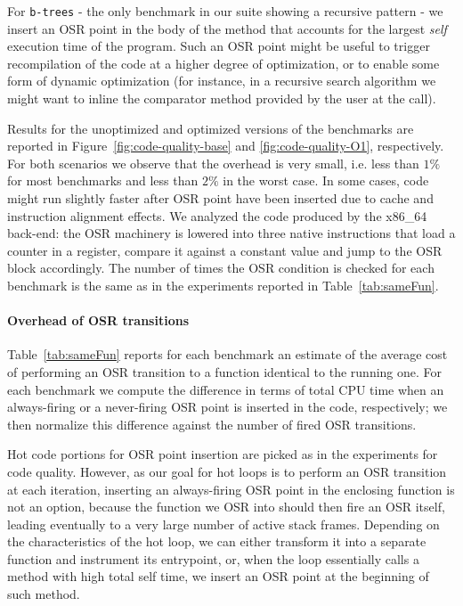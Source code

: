 For {\tt b-trees} - the only benchmark in our suite showing a recursive pattern - we insert an OSR point in the body of the method that accounts for the largest {\em self} execution time of the program. Such an OSR point might be useful to trigger recompilation of the code at a higher degree of optimization, or to enable some form of dynamic optimization (for instance, in a recursive search algorithm we might want to inline the comparator method provided by the user at the call).

Results for the unoptimized and optimized versions of the benchmarks are reported in Figure~\ref{fig:code-quality-base} and \ref{fig:code-quality-O1}, respectively. For both scenarios we observe that the overhead is very small, i.e. less than $1\%$ for most benchmarks and less than $2\%$ in the worst case. In some cases, code might run slightly faster after OSR point have been inserted due to cache and instruction alignment effects. We analyzed the code produced by the x86\_64 back-end: the OSR machinery is lowered into three native instructions that load a counter in a register, compare it against a constant value and jump to the OSR block accordingly. The number of times the OSR condition is checked for each benchmark is the same as in the experiments reported in Table~\ref{tab:sameFun}.
  
\paragraph{Overhead of OSR transitions}

Table~\ref{tab:sameFun} reports for each benchmark an estimate of the average cost of performing an OSR transition to a function identical to the running one. For each benchmark we compute the difference in terms of total CPU time when an always-firing or a never-firing OSR point is inserted in the code, respectively; we then normalize this difference against the number of fired OSR transitions.

Hot code portions for OSR point insertion are picked as in the experiments for code quality. However, as our goal for hot loops is to perform an OSR transition at each iteration, inserting an always-firing OSR point in the enclosing function is not an option, because the function we OSR into should then fire an OSR itself, leading eventually to a very large number of active stack frames. Depending on the characteristics of the hot loop, we can either transform it into a separate function and instrument its entrypoint, or, when the loop essentially calls a method with high total self time, we insert an OSR point at the beginning of such method.

